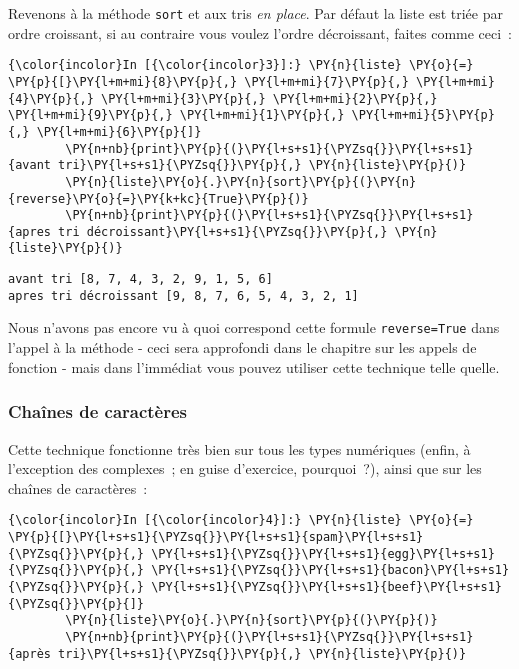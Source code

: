     Revenons à la méthode \texttt{sort} et aux tris \emph{en place}. Par
défaut la liste est triée par ordre croissant, si au contraire vous
voulez l'ordre décroissant, faites comme ceci~:

    \begin{Verbatim}[commandchars=\\\{\}]
{\color{incolor}In [{\color{incolor}3}]:} \PY{n}{liste} \PY{o}{=} \PY{p}{[}\PY{l+m+mi}{8}\PY{p}{,} \PY{l+m+mi}{7}\PY{p}{,} \PY{l+m+mi}{4}\PY{p}{,} \PY{l+m+mi}{3}\PY{p}{,} \PY{l+m+mi}{2}\PY{p}{,} \PY{l+m+mi}{9}\PY{p}{,} \PY{l+m+mi}{1}\PY{p}{,} \PY{l+m+mi}{5}\PY{p}{,} \PY{l+m+mi}{6}\PY{p}{]}
        \PY{n+nb}{print}\PY{p}{(}\PY{l+s+s1}{\PYZsq{}}\PY{l+s+s1}{avant tri}\PY{l+s+s1}{\PYZsq{}}\PY{p}{,} \PY{n}{liste}\PY{p}{)}
        \PY{n}{liste}\PY{o}{.}\PY{n}{sort}\PY{p}{(}\PY{n}{reverse}\PY{o}{=}\PY{k+kc}{True}\PY{p}{)}
        \PY{n+nb}{print}\PY{p}{(}\PY{l+s+s1}{\PYZsq{}}\PY{l+s+s1}{apres tri décroissant}\PY{l+s+s1}{\PYZsq{}}\PY{p}{,} \PY{n}{liste}\PY{p}{)}
\end{Verbatim}


    \begin{Verbatim}[commandchars=\\\{\}]
avant tri [8, 7, 4, 3, 2, 9, 1, 5, 6]
apres tri décroissant [9, 8, 7, 6, 5, 4, 3, 2, 1]

    \end{Verbatim}

    Nous n'avons pas encore vu à quoi correspond cette formule
\texttt{reverse=True} dans l'appel à la méthode - ceci sera approfondi
dans le chapitre sur les appels de fonction - mais dans l'immédiat vous
pouvez utiliser cette technique telle quelle.

    \hypertarget{chauxeenes-de-caractuxe8res}{%
\subsubsection{Chaînes de
caractères}\label{chauxeenes-de-caractuxe8res}}

    Cette technique fonctionne très bien sur tous les types numériques
(enfin, à l'exception des complexes~; en guise d'exercice, pourquoi~?),
ainsi que sur les chaînes de caractères~:

    \begin{Verbatim}[commandchars=\\\{\}]
{\color{incolor}In [{\color{incolor}4}]:} \PY{n}{liste} \PY{o}{=} \PY{p}{[}\PY{l+s+s1}{\PYZsq{}}\PY{l+s+s1}{spam}\PY{l+s+s1}{\PYZsq{}}\PY{p}{,} \PY{l+s+s1}{\PYZsq{}}\PY{l+s+s1}{egg}\PY{l+s+s1}{\PYZsq{}}\PY{p}{,} \PY{l+s+s1}{\PYZsq{}}\PY{l+s+s1}{bacon}\PY{l+s+s1}{\PYZsq{}}\PY{p}{,} \PY{l+s+s1}{\PYZsq{}}\PY{l+s+s1}{beef}\PY{l+s+s1}{\PYZsq{}}\PY{p}{]}
        \PY{n}{liste}\PY{o}{.}\PY{n}{sort}\PY{p}{(}\PY{p}{)}
        \PY{n+nb}{print}\PY{p}{(}\PY{l+s+s1}{\PYZsq{}}\PY{l+s+s1}{après tri}\PY{l+s+s1}{\PYZsq{}}\PY{p}{,} \PY{n}{liste}\PY{p}{)}
\end{Verbatim}


